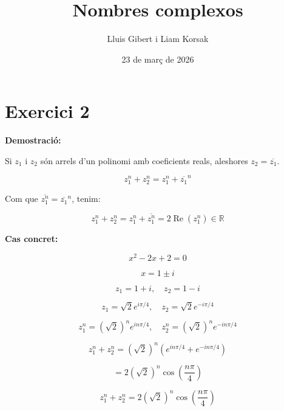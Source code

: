 \documentclass{article}
\title{Nombres complexos}
\author{Lluis Gibert i Liam Korsak}
\date{23 de març de 2026}
\begin{document}
\maketitle
\section*{Exercici 2}

\textbf{Demostració:}

Si $z_1$ i $z_2$ són arrels d’un polinomi amb coeficients reals, aleshores
$z_2=\overline{z_1}$.

\[
z_1^n + z_2^n = z_1^n + \overline{z_1}^n
\]

Com que $\overline{z_1^n} = \overline{z_1}^n$, tenim:

\[
z_1^n + z_2^n = z_1^n + \overline{z_1^n}
= 2\operatorname{Re}(z_1^n) \in \mathbb{R}
\]

\textbf{Cas concret:}

\[
x^2 - 2x + 2 = 0
\]

\[
x = 1 \pm i
\]

\[
z_1 = 1+i,\quad z_2 = 1-i
\]

\[
z_1 = \sqrt{2}e^{i\pi/4},\quad z_2 = \sqrt{2}e^{-i\pi/4}
\]

\[
z_1^n = (\sqrt{2})^n e^{i n\pi/4},\quad
z_2^n = (\sqrt{2})^n e^{-i n\pi/4}
\]

\[
z_1^n + z_2^n =
(\sqrt{2})^n \left(e^{i n\pi/4} + e^{-i n\pi/4}\right)
\]

\[
= 2(\sqrt{2})^n \cos\left(\frac{n\pi}{4}\right)
\]

\[
\boxed{
z_1^n + z_2^n = 2(\sqrt{2})^n \cos\left(\frac{n\pi}{4}\right)
}
\]
\end{document}
